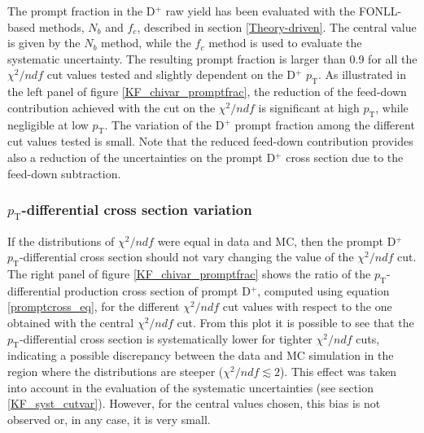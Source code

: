 \documentclass[b5paper,10pt,twoside,oldstyle,classica]{toptesi}
\newcommand{\pt}{p_\text{T}}
\begin{document}
The prompt fraction in the D$^+$ raw yield has been evaluated with the FONLL-based methods, $N_b$ and $f_c$, described in section \ref{Theory-driven}. The central value is given by the $N_b$ method, while the $f_c$ method is used to evaluate the systematic uncertainty. The resulting prompt fraction is larger than 0.9 for all the $\chi^2/ndf$ cut values tested and slightly dependent on the D$^+$ $\pt$. As illustrated in the left panel of figure \ref{KF_chivar_promptfrac}, the reduction of the feed-down contribution achieved with the cut on the $\chi^2/ndf$ is significant at high $\pt$, while negligible at low $\pt$. The variation of the D$^+$ prompt fraction among the different cut values tested is small. Note that the reduced feed-down contribution provides also a reduction of the uncertainties on the prompt D$^+$ cross section due to the feed-down subtraction.  
\subsubsection{$\pt$-differential cross section variation}
If the distributions of $\chi^2/ndf$ were equal in data and MC, then the prompt D$^+$ $\pt$-differential cross section should not vary changing the value of the $\chi^2/ndf$ cut. The right panel of figure \ref{KF_chivar_promptfrac} shows the ratio of the $\pt$-differential production cross section of prompt D$^+$, computed using equation \ref{promptcross_eq}, for the different $\chi^2/ndf$ cut values with respect to the one obtained with the central $\chi^2/ndf$ cut. From this plot it is possible to see that the $\pt$-differential cross section is systematically lower for tighter $\chi^2/ndf$ cuts, indicating a possible discrepancy between the data and MC simulation in the region where the distributions are steeper ($\chi^2/ndf \lesssim 2$). This effect was taken into account in the evaluation of the systematic uncertainties (see section \ref{KF_syst_cutvar}). However, for the central values chosen, this bias is not observed or, in any case, it is very small.    
\label{KF_chi_crossvar_sec}
\end{document}
